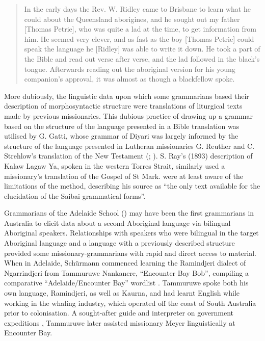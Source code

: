 \begin{quote}
    In the early days the Rev. W. Ridley came to Brisbane to learn what he could about the Queensland aborigines, and he sought out my father [Thomas Petrie], who was quite a lad at the time, to get information from him. He seemed very clever, and as fast as the boy [Thomas Petrie] could speak the language he [Ridley] was able to write it down. He took a part of the Bible and read out verse after verse, and the lad followed in the black’s tongue. Afterwards reading out the aboriginal version for his young companion’s approval, it was almost as though a blackfellow spoke. \citep[140]{petrie_tom_1904}
\end{quote}

More dubiously, the linguistic data upon which some grammarians based their description of morphosyntactic structure were translations of liturgical texts made by previous missionaries. This dubious practice of drawing up a grammar based on the structure of the language presented in a Bible translation was utilised by G. Gatti, whose grammar of Diyari \citeyearpar{gatti_lingua_1930} was largely informed by the structure of the language presented in Lutheran missionaries G. Reuther and C. Strehlow’s translation of the New Testament (\citeyear{reuther_testamenta_1897}; ). S. Ray’s (1893) description of Kalaw Lagaw Ya, spoken in the western Torres Strait, similarly used a missionary’s translation of the Gospel of St Mark. \citet[119]{ray_study_1893} were at least aware of the limitations of the method, describing his source as “the only text available for the elucidation of the Saibai grammatical forms”. 

Grammarians of the Adelaide School () may have been the first grammarians in Australia to elicit data about a second Aboriginal language via bilingual Aboriginal speakers. Relationships with speakers who were bilingual in the target Aboriginal language and a language with a previously described structure provided some missionary-grammarians with rapid and direct access to material. When in Adelaide, Schürmann commenced learning the Ramindjeri dialect of Ngarrindjeri from Tammuruwe Nankanere, “Encounter Bay Bob”, compiling a comparative “Adelaide/Encounter Bay” wordlist \citep[68]{amery_warrabarna_2016}. Tammuruwe spoke both his own language, Ramindjeri, as well as Kaurna, and had learnt English while working in the whaling industry, which operated off the coast of South Australia prior to colonisation. A sought-after guide and interpreter on government expeditions \citep{Lockwood2017}, Tammuruwe later assisted missionary Meyer linguistically at Encounter Bay. 

